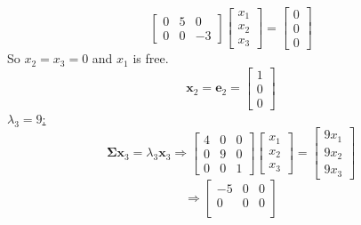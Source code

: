 \begin{enumerate}[font=\bfseries]
\begin{enumerate}
\[\begin{bmatrix}
                    0 & 5 & 0\\
                    0 & 0 & -3
                \end{bmatrix}
                \begin{bmatrix}
                    x_1 \\
                    x_2 \\
                    x_3
                \end{bmatrix}
                =
                \begin{bmatrix}
                    0 \\
                    0 \\
                    0
                \end{bmatrix}
            \]
            So $x_2 = x_3 = 0$ and $x_1$ is free.
            \[
                \mathbf{x}_2
                =
                \mathbf{e}_2
                =
                \begin{bmatrix}
                    1 \\
                    0 \\
                    0
                \end{bmatrix}
            \]
            \underline{$\lambda_3 = 9$:}
            \[
                \mathbf{\Sigma}\mathbf{x}_3 = \lambda_3\mathbf{x}_3
                \Rightarrow
                \begin{bmatrix}
                    4 & 0 & 0\\
                    0 & 9 & 0\\
                    0 & 0 & 1
                \end{bmatrix}
                \begin{bmatrix}
                    x_1 \\
                    x_2 \\
                    x_3
                \end{bmatrix}
                =
                \begin{bmatrix}
                    9x_1 \\
                    9x_2 \\
                    9x_3
                \end{bmatrix}
            \]
            \[
                \Rightarrow
                \begin{bmatrix}
                    -5 & 0 & 0\\
                    0 & 0 & 0\\

\end{bmatrix}\]
\end{enumerate}
\end{enumerate}
